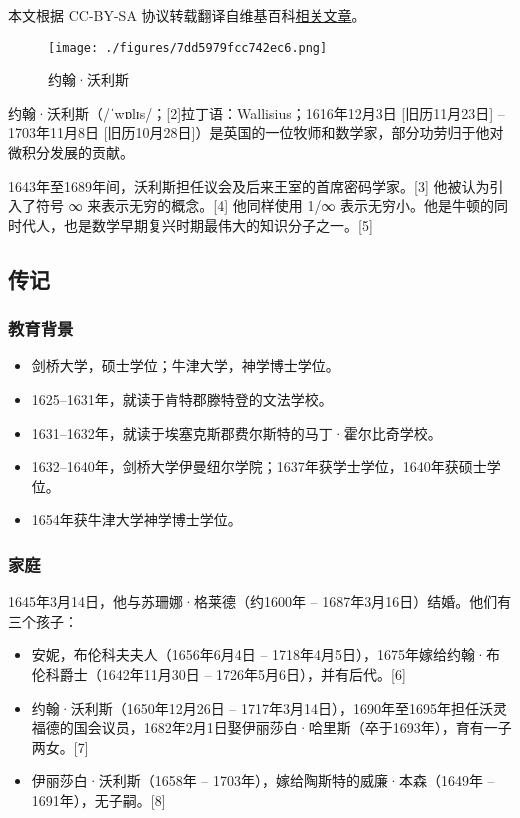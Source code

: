 
本文根据 CC-BY-SA 协议转载翻译自维基百科\href{https://en.wikipedia.org/wiki/John_Wallis}{相关文章}。

\begin{figure}[ht]
\centering
\texttt{[image: ./figures/7dd5979fcc742ec6.png]}
\caption{约翰·沃利斯} \label{fig_YHALS_1}
\end{figure}
约翰·沃利斯（/ˈwɒlɪs/；[2]拉丁语：Wallisius；1616年12月3日 [旧历11月23日] – 1703年11月8日 [旧历10月28日]）是英国的一位牧师和数学家，部分功劳归于他对微积分发展的贡献。

1643年至1689年间，沃利斯担任议会及后来王室的首席密码学家。[3] 他被认为引入了符号 ∞ 来表示无穷的概念。[4] 他同样使用 1/∞ 表示无穷小。他是牛顿的同时代人，也是数学早期复兴时期最伟大的知识分子之一。[5]
\subsection{传记}
\subsubsection{教育背景}  
\begin{itemize}
\item 剑桥大学，硕士学位；牛津大学，神学博士学位。  
\item 1625–1631年，就读于肯特郡滕特登的文法学校。  
\item 1631–1632年，就读于埃塞克斯郡费尔斯特的马丁·霍尔比奇学校。  
\item 1632–1640年，剑桥大学伊曼纽尔学院；1637年获学士学位，1640年获硕士学位。  
\item 1654年获牛津大学神学博士学位。
\end{itemize}
\subsubsection{家庭}
1645年3月14日，他与苏珊娜·格莱德（约1600年 – 1687年3月16日）结婚。他们有三个孩子：
\begin{itemize}
\item 安妮，布伦科夫夫人（1656年6月4日 – 1718年4月5日），1675年嫁给约翰·布伦科爵士（1642年11月30日 – 1726年5月6日），并有后代。[6]
\item 约翰·沃利斯（1650年12月26日 – 1717年3月14日），1690年至1695年担任沃灵福德的国会议员，1682年2月1日娶伊丽莎白·哈里斯（卒于1693年），育有一子两女。[7]
\item 伊丽莎白·沃利斯（1658年 – 1703年），嫁给陶斯特的威廉·本森（1649年 – 1691年），无子嗣。[8]
\end{itemize}